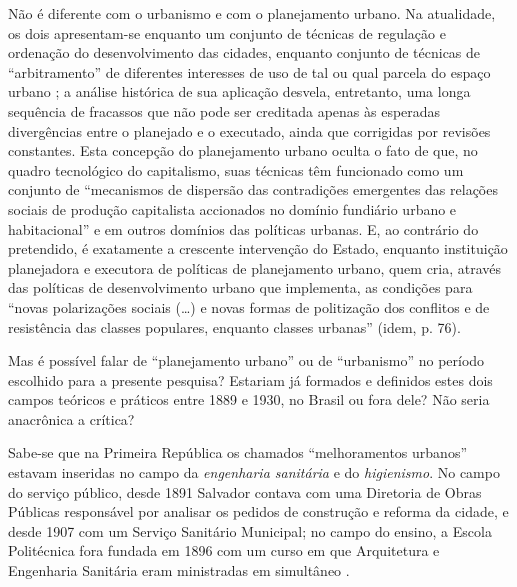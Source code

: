 Não é diferente com o urbanismo e com o planejamento urbano. Na atualidade, os dois apresentam-se enquanto um conjunto de técnicas de regulação e ordenação do desenvolvimento das cidades, enquanto conjunto de técnicas de ``arbitramento'' de diferentes interesses de uso de tal ou qual parcela do espaço urbano \cite{bernardi_organizacao_2007, campbell_intro_2003, duarte_planejamento_2007, fainstein_intro_2002}; a análise histórica de sua aplicação desvela, entretanto, uma longa sequência de fracassos \cite{hall_cidades_2007, SANTOS1982} que não pode ser creditada apenas às esperadas divergências entre o planejado e o executado, ainda que corrigidas por revisões constantes. Esta concepção do planejamento urbano oculta o fato de que, no quadro tecnológico do capitalismo, suas técnicas têm funcionado como um conjunto de ``mecanismos de dispersão das contradições emergentes das relações sociais de produção capitalista accionados no domínio fundiário urbano e habitacional'' \cite[p~76]{SANTOS1982} e em outros domínios das políticas urbanas. E, ao contrário do pretendido, é exatamente a crescente intervenção do Estado, enquanto instituição planejadora e executora de políticas de planejamento urbano, quem cria, através das políticas de desenvolvimento urbano que implementa, as condições para ``novas polarizações sociais (…) e novas formas de politização dos conflitos e de resistência das classes populares, enquanto classes urbanas'' (idem, p. 76).

Mas é possível falar de ``planejamento urbano'' ou de ``urbanismo'' no período escolhido para a presente pesquisa? Estariam já formados e definidos estes dois campos teóricos e práticos entre 1889 e 1930, no Brasil ou fora dele?  Não seria anacrônica a crítica?

Sabe-se que na Primeira República os chamados ``melhoramentos urbanos'' estavam inseridas no campo da \textit{engenharia sanitária} e do \textit{higienismo}. No campo do serviço público, desde 1891 Salvador contava com uma Diretoria de Obras Públicas responsável por analisar os pedidos de construção e reforma da cidade, e desde 1907 com um Serviço Sanitário Municipal; no campo do ensino, a Escola Politécnica fora fundada em 1896 com um curso em que Arquitetura e Engenharia Sanitária eram ministradas em simultâneo \cite{fernandessampaiogomes1999}. 

